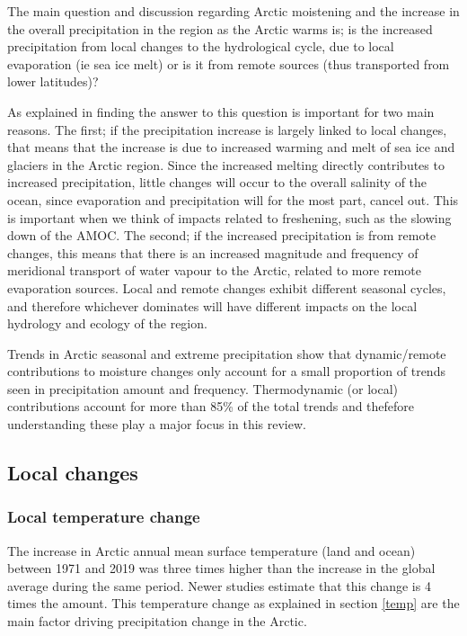 \documentclass[12pt, oneside]{article}
\begin{document}
The main question and discussion regarding Arctic moistening and the increase in the overall precipitation in the region as the Arctic warms is; is the increased precipitation from local changes to the hydrological cycle, due to local evaporation (ie sea ice melt) or is it from remote sources (thus transported from lower latitudes)?

As explained in\cite{bintanja2014future} finding the answer to this question is important for two main reasons. The first; if the precipitation increase is largely linked to local changes, that means that the increase is due to increased warming and melt of sea ice and glaciers in the Arctic region. Since the increased melting directly contributes to increased precipitation, little changes will occur to the overall salinity of the ocean, since evaporation and precipitation will for the most part, cancel out. This is important when we think of impacts related to freshening, such as the slowing down of the AMOC. The second; if the increased precipitation is from remote changes, this means that there is an increased magnitude and frequency of meridional transport of water vapour to the Arctic, related to more remote evaporation sources. Local and remote changes exhibit different seasonal cycles, and therefore whichever dominates will have different impacts on the local hydrology and ecology of the region.


Trends in Arctic seasonal and extreme precipitation show that dynamic/remote contributions to moisture changes only account for a small proportion of trends seen in precipitation amount and frequency. Thermodynamic (or local) contributions account for more than 85\% of the total trends\cite{yu2021trends} and thefefore understanding these play a major focus in this review. 








\subsection{Local changes}\label{local}

\subsubsection{Local temperature change}\label{local_temp}
The increase in Arctic annual mean surface temperature (land and ocean) between 1971 and 2019 was three times higher than the increase in the global average during the same period\cite{AMAP}. Newer studies estimate that this change is 4 times the amount\cite{rantanen2022arctic}. This temperature change as explained in section \ref{temp} are the main factor driving precipitation change in the Arctic.
\end{document}
